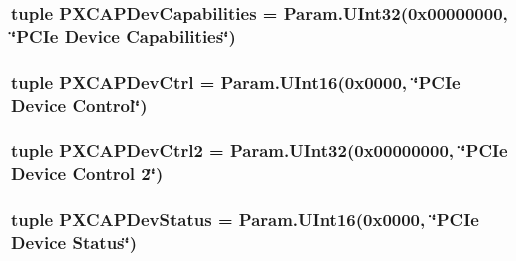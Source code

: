 \label{classPci_1_1PciDevice_a159956e2ad80c6b1983c8a24545058bd}
\hypertarget{classPci_1_1PciDevice_a0188e4c357bde5dda179f434da090760}{
\subsubsection[{PXCAPDevCapabilities}]{\setlength{\rightskip}{0pt plus 5cm}tuple {\bf PXCAPDevCapabilities} = Param.UInt32(0x00000000, \char`\"{}PCIe Device Capabilities\char`\"{})}}
\label{classPci_1_1PciDevice_a0188e4c357bde5dda179f434da090760}
\hypertarget{classPci_1_1PciDevice_a8c7342c52e738ee346240619a899d1b9}{
\subsubsection[{PXCAPDevCtrl}]{\setlength{\rightskip}{0pt plus 5cm}tuple {\bf PXCAPDevCtrl} = Param.UInt16(0x0000, \char`\"{}PCIe Device Control\char`\"{})}}
\label{classPci_1_1PciDevice_a8c7342c52e738ee346240619a899d1b9}
\hypertarget{classPci_1_1PciDevice_a867be9885742d746cbcbde5df5fb2959}{
\subsubsection[{PXCAPDevCtrl2}]{\setlength{\rightskip}{0pt plus 5cm}tuple {\bf PXCAPDevCtrl2} = Param.UInt32(0x00000000, \char`\"{}PCIe Device Control 2\char`\"{})}}
\label{classPci_1_1PciDevice_a867be9885742d746cbcbde5df5fb2959}
\hypertarget{classPci_1_1PciDevice_af7deb8e97cf1e53524d5ef5239e8d099}{
\subsubsection[{PXCAPDevStatus}]{\setlength{\rightskip}{0pt plus 5cm}tuple {\bf PXCAPDevStatus} = Param.UInt16(0x0000, \char`\"{}PCIe Device Status\char`\"{})}}
